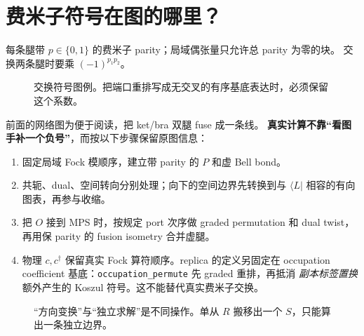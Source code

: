 \documentclass[11pt]{article}
\begin{document}
\section{费米子符号在图的哪里？}
每条腿带 $p\in\{0,1\}$ 的费米子 parity；局域偶张量只允许总 parity 为零的块。
交换两条腿时要乘 $(-1)^{p_1p_2}$。
\begin{figure}[h]\centering
{}
\caption{交换符号图例。把端口重排写成无交叉的有序基底表达时，必须保留这个系数。}
\end{figure}

前面的网络图为便于阅读，把 ket/bra 双腿 fuse 成一条线。
\textbf{真实计算不靠“看图手补一个负号”}，而按以下步骤保留原图信息：
\begin{enumerate}
\item 固定局域 Fock 模顺序，建立带 parity 的 $P$ 和虚 Bell bond。
\item 共轭、dual、空间转向分别处理；向下的空间边界先转换到与
$\langle L|$ 相容的有向图表，再参与收缩。
\item 把 $O$ 接到 MPS 时，按规定 port 次序做 graded permutation 和
dual twist，再用保 parity 的 fusion isometry 合并虚腿。
\item 物理 $c,c^\dagger$ 保留真实 Fock 算符顺序。replica 的定义另固定在
occupation coefficient 基底：\texttt{occupation\_permute} 先 graded 重排，再抵消
\emph{副本标签置换}额外产生的 Koszul 符号。这不能替代真实费米子交换。
\end{enumerate}

\begin{figure}[h]\centering
{}
\caption{“方向变换”与“独立求解”是不同操作。单从 $R$ 搬移出一个 $S$，只能算出一条独立边界。}
\end{figure}
\end{document}
